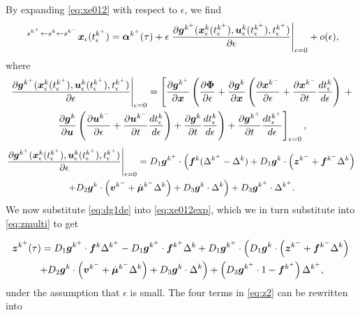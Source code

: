 \documentclass[DC2017114Bouma.tex]{subfiles}
\begin{document}
By expanding \eqref{eq:xe012} with respect to $\epsilon$, we find
\begin{align}
\ ^{s^{k^+}\leftarrow s^{k}\leftarrow s^{k^-}}{\boldsymbol{x}}_\epsilon(t_\epsilon^{k^+}) = \boldsymbol{\alpha}^{k^+}(\tau) + \epsilon\left.\frac{\partial{\boldsymbol{g}}^{k^+}({\boldsymbol{x}}^{k}_\epsilon(t_\epsilon^{k^+}),{\boldsymbol{u}}^{k}_\epsilon(t_\epsilon^{k^+}),t_\epsilon^{k^+})}{\partial\epsilon}\right|_{\epsilon=0} + o(\epsilon),\label{eq:xe012exp}
\end{align}
where
\begin{multline}
\left.\frac{\partial{\boldsymbol{g}}^{k^+}({\boldsymbol{x}}^{k}_\epsilon(t_\epsilon^{k^+}),{\boldsymbol{u}}^{k}_\epsilon(t_\epsilon^{k^+}),t_\epsilon^{k^+})}{\partial\epsilon}\right|_{\epsilon=0} = \left[\frac{\partial{\boldsymbol{g}}^{k^+}}{\partial{\boldsymbol{x}}}\left(\frac{\partial\boldsymbol{\Phi}}{\partial\epsilon} + \frac{\partial{\boldsymbol{g}}^{k}}{\partial{\boldsymbol{x}}}\left(\frac{\partial{\boldsymbol{x}}^{k^-}}{\partial\epsilon} + \frac{\partial{\boldsymbol{x}}^{k^-}}{\partial t}\frac{d t_\epsilon^{k}}{d \epsilon}\right)\right.\right. +\\ \left.\left.\frac{\partial{\boldsymbol{g}}^{k}}{\partial{\boldsymbol{u}}}\left(\frac{\partial{\boldsymbol{u}}^{k^-}}{\partial\epsilon} + \frac{\partial{\boldsymbol{u}}^{k^-}}{\partial t}\frac{d t_\epsilon^{k}}{d \epsilon}\right) + \frac{\partial{\boldsymbol{g}}^{k}}{\partial t}\frac{d t_\epsilon^{k}}{d\epsilon}\right) + \frac{\partial {\boldsymbol{g}}^{k^+}}{\partial t}\frac{dt^{k^+}_\epsilon}{d\epsilon}\right]_{\epsilon=0},
\end{multline}
\begin{multline}
\left.\frac{\partial{\boldsymbol{g}}^{k^+}({\boldsymbol{x}}^{k}_\epsilon(t_\epsilon^{k^+}),{\boldsymbol{u}}^{k}_\epsilon(t_\epsilon^{k^+}),t_\epsilon^{k^+})}{\partial\epsilon}\right|_{\epsilon=0} = D_1{\boldsymbol{g}}^{k^+}\cdot\left({\boldsymbol{f}}^{k}(\Delta^{k^+}-\Delta^{k}) + D_1{\boldsymbol{g}}^{k}\cdot\left({\boldsymbol{z}}^{k^-}+{\boldsymbol{f}}^{k^-}\Delta^{k}\right)\right. \\ \left.+ D_2{\boldsymbol{g}}^{k}\cdot\left({\boldsymbol{v}}^{k^-}+\dot{\boldsymbol{\mu}}^{k^-}\Delta^{k}\right) + D_3{\boldsymbol{g}}^{k}\cdot\Delta^{k}\right)+D_3{\boldsymbol{g}}^{k^+}\cdot\Delta^{k^+}. \label{eq:dg1de}
\end{multline}
We now substitute \eqref{eq:dg1de} into \eqref{eq:xe012exp}, which we in turn substitute into \eqref{eq:zmulti} to get

\begin{multline}
{\boldsymbol{z}}^{k^+}(\tau) = D_1{\boldsymbol{g}}^{k^+}\cdot{\boldsymbol{f}}^{k}\Delta^{k^+} - D_1{\boldsymbol{g}}^{k^+}\cdot{\boldsymbol{f}}^{k^+}\Delta^{k} + D_1{\boldsymbol{g}}^{k^+}\cdot\left(D_1{\boldsymbol{g}}^{k}\cdot\left({\boldsymbol{z}}^{k^-}+{\boldsymbol{f}}^{k^-}\Delta^{k}\right)\right.\\
\left.+D_2{\boldsymbol{g}}^{k}\cdot\left({\boldsymbol{v}}^{k^-}+\dot{\boldsymbol{\mu}}^{k^-}\Delta^{k}\right)+D_3{\boldsymbol{g}}^{k}\cdot\Delta^{k}\right) + \left(D_3{\boldsymbol{g}}^{k^+}\cdot 1 - {\boldsymbol{f}}^{k^+}\right)\Delta^{k^+},\label{eq:z2}
\end{multline}
under the assumption that $\epsilon$ is small. The four terms in \eqref{eq:z2} can be rewritten into
\end{document}
